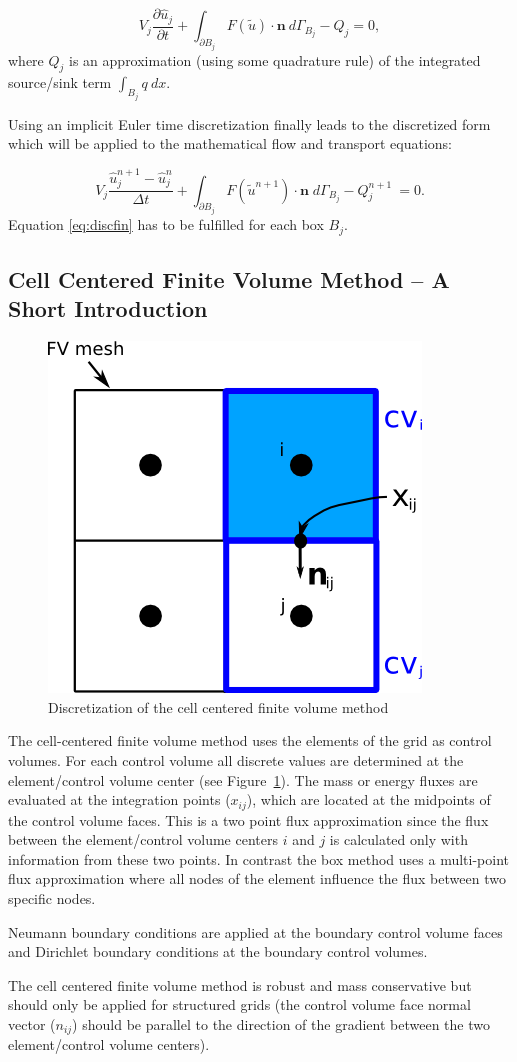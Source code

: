 \begin{equation}
\label{eq:disc1}
	V_j \frac{\partial \hat u_j}{\partial t}
	+  \int_{\partial B_j}  F(\tilde u) \cdot \mathbf n \: d\varGamma_{B_j} - Q_j = 0,
\end{equation}
where $Q_j$ is an approximation (using some quadrature rule) of the integrated source/sink term $\int_{B_j} q \: dx$.

Using an implicit Euler time discretization finally
leads to the discretized form which will be applied to the mathematical
flow and transport equations:

\begin{equation}
\label{eq:discfin}
	V_j \frac{\hat u_j^{n+1} - \hat u_j^{n}}{\Delta t}
	+ \int_{\partial B_j}  F(\tilde u^{n+1}) \cdot \mathbf n
	\;  d{\varGamma}_{B_j} - Q_j^{n+1} \: = 0.
\end{equation}
Equation \eqref{eq:discfin} has to be fulfilled for each box $B_j$.

\subsection{Cell Centered Finite Volume Method -- A Short Introduction}\label{cc}

\begin{figure} [ht]
\centering
\includegraphics[width=0.4\linewidth,keepaspectratio]{png/cc_disc.png}
\caption{\label{pc:cc} Discretization of the cell centered finite volume method}
\end{figure}

The cell-centered finite volume method uses the elements of the grid as control volumes.
For each control volume all discrete values are determined at the element/control
volume center (see Figure~\ref{pc:cc}).
The mass or energy fluxes are evaluated at the integration points ($x_{ij}$),
which are located at the midpoints of the control
volume faces. This is a two point flux approximation since the flux between
the element/control volume centers $i$ and $j$ is calculated
only with information from these two points. In contrast the box method uses
a multi-point flux approximation where all nodes of the
element influence the flux between two specific nodes. \par
Neumann boundary conditions are applied at the boundary control volume faces
and Dirichlet boundary conditions at the boundary control volumes. \par
The cell centered finite volume method is robust and mass conservative but
should only be applied for structured grids
(the control volume face normal vector ($n_{ij}$) should be parallel to the
direction of the gradient between the two element/control
volume centers).

